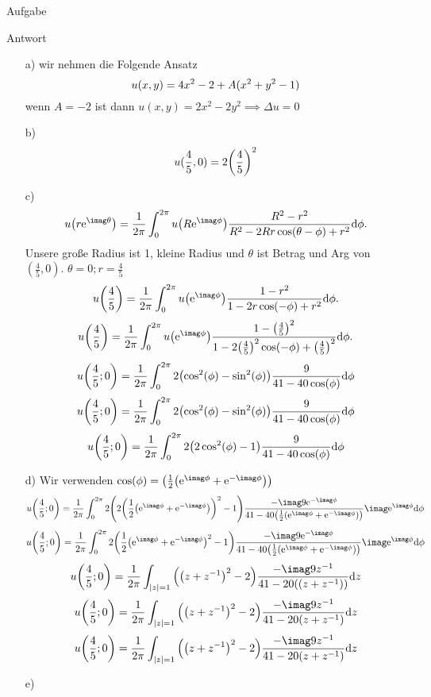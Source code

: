 \documentclass{scrartcl}
\begin{document}
\begin{section}{Aufgabe}
      \begin{subsection}{Antwort}
\begin{itemize}
\item[a)]
wir nehmen die Folgende Ansatz 
\[u\qty(x,y)=4x^2-2+A(x^2+y^2-1)\]
wenn $A=-2$ ist dann $u(x,y)=2x^2-2y^2\implies \Delta u =0$
\item[b)] 
\[u(\frac{4}{5},0)=2\qty(\frac{4}{5})^2\] 
\item[c)]  
\[u\qty(r \mathrm{e}^{\imag \theta})=\frac{1}{2\pi}\int_0^{2\pi} u\qty(R \mathrm{e}^{\imag \phi}) \frac{R^2-r^2}{R^2 -2R r \cos(\theta-\phi)+r^2}\dd \phi. \]
Unsere große Radius ist 1, kleine Radius und $\theta$ ist Betrag und Arg von $(\frac{4}{5},0)$. $\theta=0;r=\frac{4}{5}$
\[u\qty(\frac{4}{5})=\frac{1}{2\pi}\int_0^{2\pi} u\qty(\mathrm{e}^{\imag \phi}) \frac{1-r^2}{1 -2 r \cos(-\phi)+r^2}\dd \phi. \]
\[u\qty(\frac{4}{5})=\frac{1}{2\pi}\int_0^{2\pi} u\qty(\mathrm{e}^{\imag \phi}) \frac{1-\qty(\frac{4}{5})^2}{1 -2 \qty(\frac{4}{5})^2 \cos(-\phi)+\qty(\frac{4}{5})^2}\dd \phi. \]
\[u\qty(\frac{4}{5};0)=\frac{1}{2\pi}\int_0^{2\pi}2\qty(\cos[2](\phi)-\sin[2](\phi))\frac{9}{41-40 \cos (\phi )}\dd\phi \]
\[u\qty(\frac{4}{5};0)=\frac{1}{2\pi}\int_0^{2\pi}2\qty(\cos[2](\phi)-\sin[2](\phi))\frac{9}{41-40 \cos (\phi )} \dd\phi\]
\[u\qty(\frac{4}{5};0)=\frac{1}{2\pi}\int_0^{2\pi}2\qty(2\cos[2](\phi)-1)\frac{9}{41-40 \cos (\phi )}\dd\phi \]

\item[d)] 
Wir verwenden $\cos(\phi)=\qty(\frac{1}{2}\qty(\mathrm{e}^{\imag \phi}+\mathrm{e}^{-\imag \phi}))$ 
\[u\qty(\frac{4}{5};0)=\frac{1}{2\pi}\int_0^{2\pi}2\qty(2\qty(\frac{1}{2}\qty(\mathrm{e}^{\imag \phi}+\mathrm{e}^{-\imag \phi}))^2-1)\frac{- \imag 9 \mathrm{e}^{-\imag \phi}}{41-40 \qty(\frac{1}{2}\qty(\mathrm{e}^{\imag \phi}+\mathrm{e}^{-\imag \phi}))} \imag \mathrm{e}^{\imag \phi}\dd\phi \]
\[u\qty(\frac{4}{5};0)=\frac{1}{2\pi}\int_0^{2\pi}2\qty(\frac{1}{2}\qty(\mathrm{e}^{\imag \phi}+\mathrm{e}^{-\imag \phi})^2-1)\frac{- \imag 9 \mathrm{e}^{-\imag \phi}}{41-40 \qty(\frac{1}{2}\qty(\mathrm{e}^{\imag \phi}+\mathrm{e}^{-\imag \phi}))} \imag \mathrm{e}^{\imag \phi}\dd\phi \]
\[u\qty(\frac{4}{5};0)=\frac{1}{2\pi}\int_{\qty|z|=1}\qty(\qty(z+z^{-1})^2-2)\frac{- \imag 9 z^{-1}}{41-20 \qty(\qty(z+z^{-1}))} \dd z \]
\[u\qty(\frac{4}{5};0)=\frac{1}{2\pi}\int_{\qty|z|=1}\qty(\qty(z+z^{-1})^2-2)\frac{- \imag 9 z^{-1}}{41-20 \qty(z+z^{-1})} \dd z \]
\[u\qty(\frac{4}{5};0)=\frac{1}{2\pi}\int_{\qty|z|=1}\qty(\qty(z+z^{-1})^2-2)\frac{- \imag 9 z^{-1}}{41-20 \qty(z+z^{-1})} \dd z \]
\item[e)] 
\end{itemize}
    \end{subsection}  
\end{section}
\end{document}
